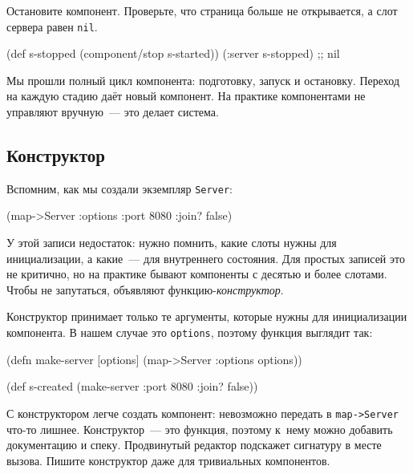 Остановите компонент. Проверьте, что страница больше не открывается, а слот
сервера равен \verb|nil|.

\begin{english}
  \begin{clojure}
(def s-stopped (component/stop s-started))
(:server s-stopped) ;; nil
  \end{clojure}
\end{english}

Мы прошли полный цикл компонента: подготовку, запуск и остановку. Переход на
каждую стадию даёт новый компонент. На практике компонентами не управляют
вручную~--- это делает система.

\subsection{Конструктор}


Вспомним, как мы создали экземпляр \verb|Server|:

\begin{english}
  \begin{clojure}
(map->Server {:options {:port 8080 :join? false}})
  \end{clojure}
\end{english}


У этой записи недостаток: нужно помнить, какие слоты нужны для инициализации, а
какие~--- для внутреннего состояния. Для простых записей это не критично, но на
практике бывают компоненты с десятью и более слотами. Чтобы не запутаться,
объявляют функцию-\emph{конструктор}.

Конструктор принимает только те аргументы, которые нужны для инициализации
компонента. В нашем случае это \verb|options|, поэтому функция выглядит так:

\begin{english}
  \begin{clojure}
(defn make-server
  [options]
  (map->Server {:options options}))

(def s-created (make-server {:port 8080 :join? false}))
  \end{clojure}
\end{english}

С конструктором легче создать компонент: невозможно передать в
\verb|map->Server| что-то лишнее. Конструктор~--- это функция, поэтому к~нему можно
добавить документацию и спеку. Продвинутый редактор подскажет сигнатуру в месте
вызова. Пишите конструктор даже для тривиальных компонентов.

